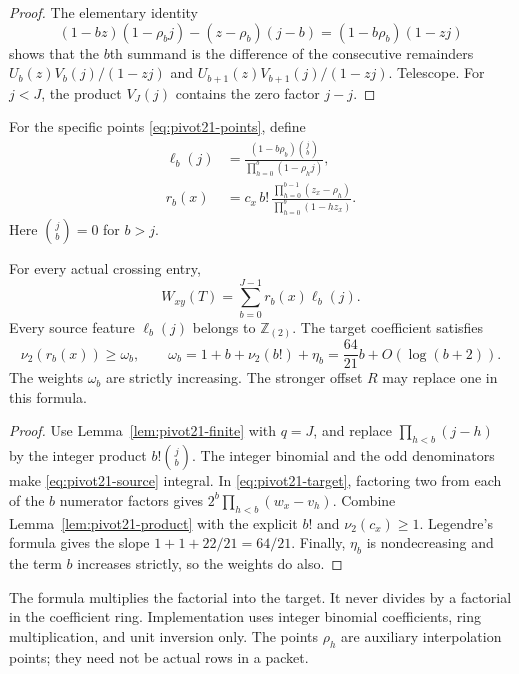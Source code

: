 \begin{proof}
The elementary identity
\[
 (1-bz)(1-\rho_bj)-(z-\rho_b)(j-b)
   =(1-b\rho_b)(1-zj)
\]
shows that the $b$th summand is the difference of the consecutive
remainders $U_b(z)V_b(j)/(1-zj)$ and
$U_{b+1}(z)V_{b+1}(j)/(1-zj)$. Telescope. For $j<J$, the product
$V_J(j)$ contains the zero factor $j-j$.
\end{proof}

For the specific points \eqref{eq:pivot21-points}, define
\begin{align}
 \ell_b(j)&=
 \frac{(1-b\rho_b)\binom jb}
      {\prod_{h=0}^{b}(1-\rho_hj)},
 \label{eq:pivot21-source}\\
 r_b(x)&=
 c_x\,b!\,
 \frac{\prod_{h=0}^{b-1}(z_x-\rho_h)}
      {\prod_{h=0}^{b}(1-hz_x)}.
 \label{eq:pivot21-target}
\end{align}
Here $\binom jb=0$ for $b>j$.

\begin{theorem}
\label{thm:pivot21-kernel}
For every actual crossing entry,
\[
 W_{xy}(T)=\sum_{b=0}^{J-1}r_b(x)\ell_b(j).
\]
Every source feature $\ell_b(j)$ belongs to $\mathbb Z_{(2)}$.
The target coefficient satisfies
\begin{equation}
 \nu_2(r_b(x))\ge\omega_b,
 \qquad
 \omega_b=1+b+\nu_2(b!)+\eta_b
          =\frac{64}{21}b+O(\log(b+2)).
 \label{eq:pivot21-weight}
\end{equation}
The weights $\omega_b$ are strictly increasing. The stronger offset
$R$ may replace one in this formula.
\end{theorem}

\begin{proof}
Use Lemma~\ref{lem:pivot21-finite} with $q=J$, and replace
$\prod_{h<b}(j-h)$ by the integer product $b!\binom jb$.
The integer binomial and the odd denominators make
\eqref{eq:pivot21-source} integral. In
\eqref{eq:pivot21-target}, factoring two from each of the $b$
numerator factors gives $2^b\prod_{h<b}(w_x-v_h)$. Combine
Lemma~\ref{lem:pivot21-product} with the explicit $b!$ and
$\nu_2(c_x)\ge1$. Legendre's formula gives the slope
$1+1+22/21=64/21$. Finally, $\eta_b$ is nondecreasing and the term
$b$ increases strictly, so the weights do also.
\end{proof}

The formula multiplies the factorial into the target. It never divides
by a factorial in the coefficient ring. Implementation uses integer
binomial coefficients, ring multiplication, and unit inversion only.
The points $\rho_h$ are auxiliary interpolation points; they need not
be actual rows in a packet.

